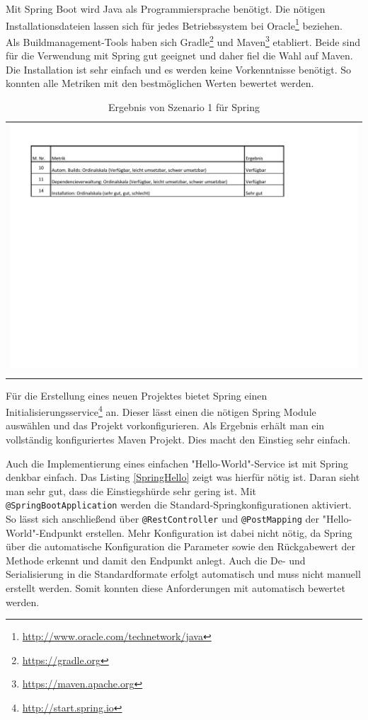 Mit Spring Boot wird Java als Programmiersprache benötigt. Die nötigen Installationsdateien lassen sich für jedes Betriebssystem bei Oracle\footnote{\url{http://www.oracle.com/technetwork/java}} beziehen.\\
Als Buildmanagement-Tools haben sich Gradle\footnote{\url{https://gradle.org}}  und Maven\footnote{\url{https://maven.apache.org}} etabliert. Beide sind für die Verwendung mit Spring gut geeignet und daher fiel die Wahl auf Maven. Die Installation ist sehr einfach und es werden keine Vorkenntnisse benötigt. So konnten alle Metriken mit den bestmöglichen Werten bewertet werden.

\begin{longtable}{c}
	\includegraphics[width=\linewidth]{Bilder/Sz1ErgebnisSpring.pdf} \\	
	\caption[Szenario 1 Ergebnis Spring]{Ergebnis von Szenario 1 für Spring}
	\label{Sz1ErgebnisSpring}\\
\end{longtable}
\FloatBarrier

Für die Erstellung eines neuen Projektes bietet Spring einen Initialisierungsservice\footnote{\url{http://start.spring.io}} an. Dieser lässt einen die nötigen Spring Module auswählen und das Projekt vorkonfigurieren. Als Ergebnis erhält man ein vollständig konfiguriertes Maven Projekt.
Dies macht den Einstieg sehr einfach.

Auch die Implementierung eines einfachen "Hello-World"-Service ist mit Spring denkbar einfach. Das Listing \ref{SpringHello} zeigt was hierfür nötig ist. Daran sieht man sehr gut, dass die Einstiegshürde sehr gering ist. 
Mit \lstinline|@SpringBootApplication| werden die Standard-Spring\-konfigurationen aktiviert. So lässt sich anschließend über \lstinline|@RestController| und \lstinline|@PostMapping| der "Hello-World"-Endpunkt erstellen.
Mehr Konfiguration ist dabei nicht nötig, da Spring über die automatische Konfiguration die Parameter sowie den Rückgabewert der Methode erkennt und damit den Endpunkt anlegt. Auch die De- und Serialisierung in die Standardformate erfolgt automatisch und muss nicht manuell erstellt werden. Somit konnten diese Anforderungen mit automatisch bewertet werden. 

